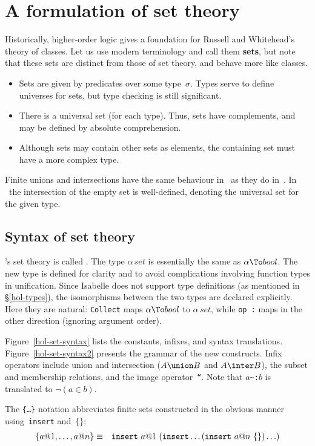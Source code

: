 \section{A formulation of set theory}
Historically, higher-order logic gives a foundation for Russell and
Whitehead's theory of classes.  Let us use modern terminology and call them
{\bf sets}, but note that these sets are distinct from those of {\ZF} set
theory, and behave more like {\ZF} classes.
\begin{itemize}
\item
Sets are given by predicates over some type~$\sigma$.  Types serve to
define universes for sets, but type checking is still significant.
\item
There is a universal set (for each type).  Thus, sets have complements, and
may be defined by absolute comprehension.
\item
Although sets may contain other sets as elements, the containing set must
have a more complex type.
\end{itemize}
Finite unions and intersections have the same behaviour in \HOL\ as they
do in~{\ZF}.  In \HOL\ the intersection of the empty set is well-defined,
denoting the universal set for the given type.


\subsection{Syntax of set theory}
\HOL's set theory is called .  The type $\alpha\,set$ is
essentially the same as $\alpha\To bool$.  The new type is defined for
clarity and to avoid complications involving function types in unification.
Since Isabelle does not support type definitions (as mentioned in
\S\ref{hol-types}), the isomorphisms between the two types are declared
explicitly.  Here they are natural: {\tt Collect} maps $\alpha\To bool$ to
$\alpha\,set$, while \hbox{\tt op :} maps in the other direction (ignoring
argument order).

Figure~\ref{hol-set-syntax} lists the constants, infixes, and syntax
translations.  Figure~\ref{hol-set-syntax2} presents the grammar of the new
constructs.  Infix operators include union and intersection ($A\union B$
and $A\inter B$), the subset and membership relations, and the image
operator~{\tt``}\@.  Note that $a$\verb|~:|$b$ is translated to
$\neg(a\in b)$.  

The {\tt\{\ldots\}} notation abbreviates finite sets constructed in the
obvious manner using~{\tt insert} and~$\{\}$:
\begin{eqnarray*}
  \{a@1, \ldots, a@n\}  & \equiv &  
  {\tt insert}~a@1~({\tt insert}\ldots({\tt insert}~a@n~\{\})\ldots)
\end{eqnarray*}

